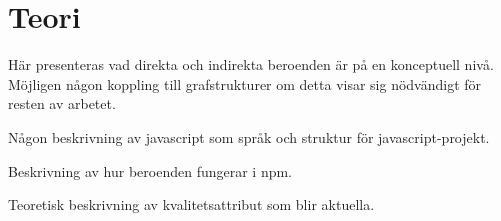 \section{Teori}
\label{sec:joel_a-theory}
Här presenteras vad direkta och indirekta beroenden är på en konceptuell nivå. Möjligen någon koppling till grafstrukturer om detta visar sig nödvändigt för resten av arbetet.

Någon beskrivning av javascript som språk och struktur för javascript-projekt.

Beskrivning av hur beroenden fungerar i npm.

Teoretisk beskrivning av kvalitetsattribut som blir aktuella.

